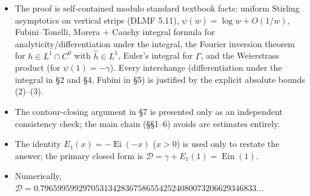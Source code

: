 \documentclass[11pt]{article}
\theoremstyle{remark}
\begin{document}
\begin{itemize}
\item The proof is self-contained modulo standard textbook facts: uniform Stirling asymptotics on vertical strips (DLMF 5.11), $\psi(w)=\log w+O(1/w)$, Fubini--Tonelli, Morera + Cauchy integral formula for analyticity/differentiation under the integral, the Fourier inversion theorem for $h\in L^1\cap C^0$ with $\widehat h\in L^1$, Euler's integral for $\Gamma$, and the Weierstrass product (for $\psi(1)=-\gamma$). Every interchange (differentiation under the integral in \S2 and \S4, Fubini in \S5) is justified by the explicit absolute bounds (2)--(3).
\item The contour-closing argument in \S7 is presented only as an independent consistency check; the main chain (\S\S1--6) avoids arc estimates entirely.
\item The identity $E_1(x)=-\operatorname{Ei}(-x)$ ($x>0$) is used only to restate the answer; the primary closed form is $\mathcal D=\gamma+E_1(1)=\operatorname{Ein}(1)$.
\item Numerically, $\mathcal D = 0.796599599297053134283675865542524080073206629346833\ldots$
\end{itemize}
\end{document}
